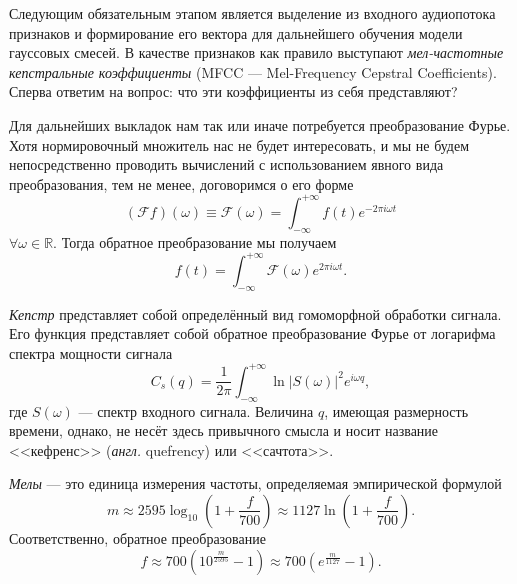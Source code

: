 \documentclass{gost-7-32}
\begin{document}
Следующим обязательным этапом является выделение из входного аудиопотока признаков и формирование его вектора для дальнейшего обучения модели гауссовых смесей.
В качестве признаков как правило \cite{vr_ml, gr_unc_env} выступают \textit{мел-частотные кепстральные коэффициенты} (MFCC --- Mel-Frequency Cepstral Coefficients).
Сперва ответим на вопрос: что эти коэффициенты из себя представляют?

Для дальнейших выкладок нам так или иначе потребуется преобразование Фурье.
Хотя нормировочный множитель нас не будет интересовать, и мы не будем непосредственно проводить вычислений с использованием явного вида преобразования, тем не менее, договоримся о его форме
\begin{equation}
    (\mathcal{F} f)(\omega) \equiv \mathcal{F}(\omega) = \int_{-\infty}^{+\infty} f(t) e^{-2 \pi i \omega t}
\end{equation}
$\forall \omega \in \mathbb{R}$. Тогда обратное преобразование мы получаем
\begin{equation}
    f(t) = \int_{-\infty}^{+\infty} \mathcal{F}(\omega) e^{2 \pi i \omega t}.
\end{equation}

\textit{Кепстр} представляет собой определённый вид гомоморфной обработки сигнала.
Его функция представляет собой обратное преобразование Фурье от логарифма спектра мощности сигнала
\begin{equation}
    C_s(q) = \frac{1}{2 \pi} \int_{-\infty}^{+\infty} \ln |S(\omega)|^2 e^{i \omega q},
\end{equation}
где $S(\omega)$ --- спектр входного сигнала.
Величина $q$, имеющая размерность времени, однако, не несёт здесь привычного смысла и носит название <<кефренс>> (\textit{англ.} quefrency) или <<сачтота>>.

\textit{Мелы} --- это единица измерения частоты, определяемая эмпирической формулой
\begin{equation}\label{eq:ftom}
    m \approx 2595 \log_{10} \left( 1 + \frac{f}{700} \right) \approx 1127 \ln \left( 1 + \frac{f}{700} \right).
\end{equation}
Соответственно, обратное преобразование
\begin{equation}
    f \approx 700 \left( 10^{\frac{m}{2595}} - 1 \right) \approx 700 \left( e^{\frac{m}{1127}} - 1 \right).
\end{equation}
\end{document}
